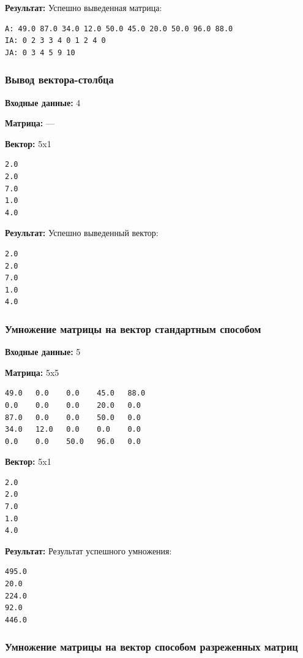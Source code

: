 \documentclass[a4paper,12pt]{extarticle}
\begin{document}
\textbf{Результат: }
Успешно выведенная матрица:

\begin{verbatim}
A: 49.0 87.0 34.0 12.0 50.0 45.0 20.0 50.0 96.0 88.0 
IA: 0 2 3 3 4 0 1 2 4 0 
JA: 0 3 4 5 9 10
\end{verbatim}


\subsubsection{Вывод вектора-столбца}

\textbf{Входные данные: }
4

\textbf{Матрица: }
---

\textbf{Вектор: }
5x1

\begin{verbatim}
2.0
2.0
7.0
1.0
4.0
\end{verbatim}

\textbf{Результат: }
Успешно выведенный вектор:

\begin{verbatim}
2.0
2.0
7.0
1.0
4.0
\end{verbatim}

\subsubsection{Умножение матрицы на вектор стандартным способом}

\textbf{Входные данные: }
5

\textbf{Матрица: }
5x5

\begin{verbatim}
49.0   0.0    0.0    45.0   88.0 
0.0    0.0    0.0    20.0   0.0   
87.0   0.0    0.0    50.0   0.0  
34.0   12.0   0.0    0.0    0.0 
0.0    0.0    50.0   96.0   0.0
\end{verbatim}

\textbf{Вектор: }
5x1

\begin{verbatim}
2.0
2.0
7.0
1.0
4.0
\end{verbatim}

\textbf{Результат: }
Результат успешного умножения:

\begin{verbatim}
495.0  
20.0   
224.0  
92.0   
446.0
\end{verbatim}

\subsubsection{Умножение матрицы на вектор способом разреженных матриц}
\end{document}
